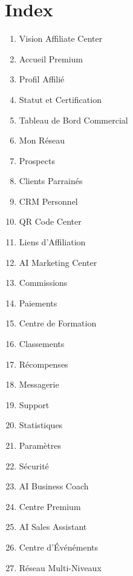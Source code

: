 \documentclass[12pt,a4paper,oneside]{book}
\begin{document}
\chapter{Index}
\begin{enumerate}
\item Vision Affiliate Center
\item Accueil Premium
\item Profil Affilié
\item Statut et Certification
\item Tableau de Bord Commercial
\item Mon Réseau
\item Prospects
\item Clients Parrainés
\item CRM Personnel
\item QR Code Center
\item Liens d'Affiliation
\item AI Marketing Center
\item Commissions
\item Paiements
\item Centre de Formation
\item Classements
\item Récompenses
\item Messagerie
\item Support
\item Statistiques
\item Paramètres
\item Sécurité
\item AI Business Coach
\item Centre Premium
\item AI Sales Assistant
\item Centre d'Événéments
\item Réseau Multi-Niveaux
\end{enumerate}
\end{document}
